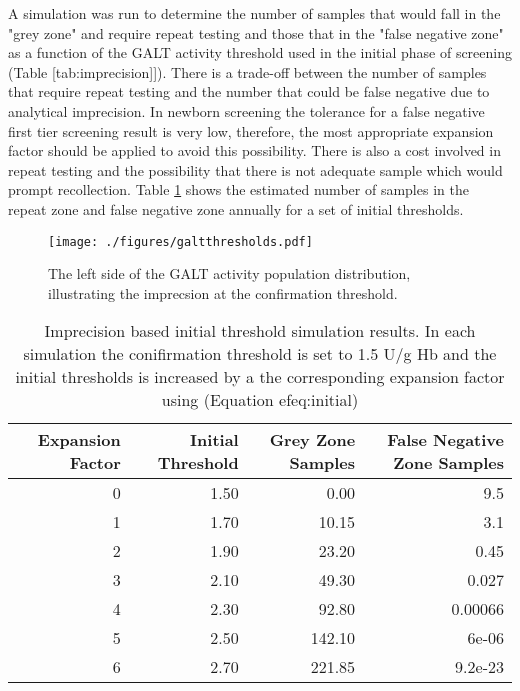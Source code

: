 \documentclass[review]{elsarticle}
\begin{document}
A simulation was run to determine the number of samples that would
fall in the "grey zone" and require repeat testing and those that in
the "false negative zone" as a function of the GALT activity threshold
used in the initial phase of screening (Table
[tab:imprecision]]). There is a trade-off between the number of
samples that require repeat testing and the number that could be false
negative due to analytical imprecision. In newborn screening the
tolerance for a false negative first tier screening result is very
low, therefore, the most appropriate expansion factor should be
applied to avoid this possibility. There is also a cost involved in
repeat testing and the possibility that there is not adequate sample
which would prompt recollection. Table \ref{tab:imprecision} shows the
estimated number of samples in the repeat zone and false negative zone
annually for a set of initial thresholds.

\begin{figure}[htbp]
\centering
\texttt{[image: ./figures/galtthresholds.pdf]}
\caption{\label{fig:orgb4f7a9b}The left side of the GALT activity population distribution, illustrating the imprecsion at the confirmation threshold.}
\end{figure}


\begin{table}[ht]
\centering
\begin{tabular}{rrrr}
  \hline
Expansion Factor & Initial Threshold & Grey Zone Samples & False Negative Zone Samples \\ 
  \hline
  0 & 1.50 & 0.00 & 9.5 \\ 
    1 & 1.70 & 10.15 & 3.1 \\ 
    2 & 1.90 & 23.20 & 0.45 \\ 
    3 & 2.10 & 49.30 & 0.027 \\ 
    4 & 2.30 & 92.80 & 0.00066 \\ 
    5 & 2.50 & 142.10 & 6e-06 \\ 
    6 & 2.70 & 221.85 & 9.2e-23 \\ 
   \hline
\end{tabular}
\caption{Imprecision based initial threshold simulation results. In each simulation the conifirmation threshold is set to 1.5 U/g Hb and the initial thresholds is increased by a the corresponding expansion factor using (Equation 
ef{eq:initial}) } 
\label{tab:imprecision}
\end{table}
\end{document}
